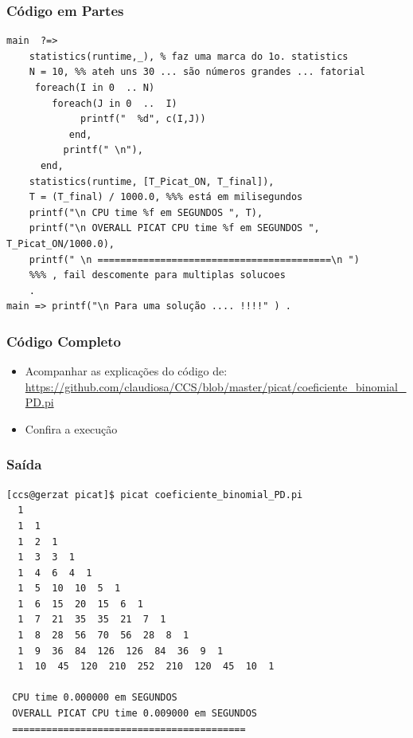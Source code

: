 \begin{frame}[fragile] 
\frametitle{Código em Partes}

\begin{small}
\begin{verbatim}
main  ?=>  
    statistics(runtime,_), % faz uma marca do 1o. statistics
    N = 10, %% ateh uns 30 ... são números grandes ... fatorial
     foreach(I in 0  .. N)
        foreach(J in 0  ..  I)
             printf("  %d", c(I,J))
           end,
          printf(" \n"),
      end, 
    statistics(runtime, [T_Picat_ON, T_final]),
    T = (T_final) / 1000.0, %%% está em milisegundos
    printf("\n CPU time %f em SEGUNDOS ", T),
    printf("\n OVERALL PICAT CPU time %f em SEGUNDOS ", T_Picat_ON/1000.0),
    printf(" \n =========================================\n ")
    %%% , fail descomente para multiplas solucoes
    .
main => printf("\n Para uma solução .... !!!!" ) .
\end{verbatim}
\end{small}
    
\end{frame}


\begin{frame}[fragile]
 \frametitle{Código Completo}

\begin{itemize}
  \item Acompanhar as explicações do código de:\\
\url{https://github.com/claudiosa/CCS/blob/master/picat/coeficiente_binomial_PD.pi}

  \item Confira a execuç\~ao
\end{itemize}
\end{frame}







\begin{frame}[fragile]

\frametitle{Saída}

\begin{small}
\begin{verbatim}
[ccs@gerzat picat]$ picat coeficiente_binomial_PD.pi 
  1 
  1  1 
  1  2  1 
  1  3  3  1 
  1  4  6  4  1 
  1  5  10  10  5  1 
  1  6  15  20  15  6  1 
  1  7  21  35  35  21  7  1 
  1  8  28  56  70  56  28  8  1 
  1  9  36  84  126  126  84  36  9  1 
  1  10  45  120  210  252  210  120  45  10  1 

 CPU time 0.000000 em SEGUNDOS 
 OVERALL PICAT CPU time 0.009000 em SEGUNDOS  
 =========================================
\end{verbatim}
    
\end{small}
\end{frame}




